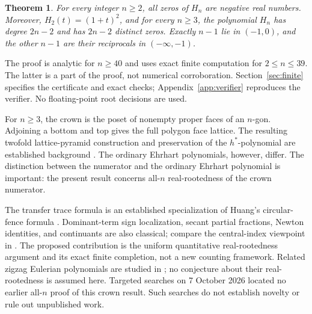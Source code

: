 \documentclass[11pt,letterpaper]{article}
\numberwithin{equation}{section}
\newtheorem{theorem}{Theorem}[section]
\begin{document}
\begin{theorem}\label{thm:main}
For every integer $n\ge2$, all zeros of $H_n$ are negative real numbers. Moreover, $H_2(t)=(1+t)^2$, and for every $n\ge3$, the polynomial $H_n$ has degree $2n-2$ and has $2n-2$ distinct zeros. Exactly $n-1$ lie in $(-1,0)$, and the other $n-1$ are their reciprocals in $(-\infty,-1)$.
\end{theorem}
The proof is analytic for $n\ge40$ and uses exact finite computation for $2\le n\le39$. The latter is a part of the proof, not numerical corroboration. Section~\ref{sec:finite} specifies the certificate and exact checks; Appendix~\ref{app:verifier} reproduces the verifier. No floating-point root decisions are used.

For $n\ge3$, the crown is the poset of nonempty proper faces of an $n$-gon. Adjoining a bottom and top gives the full polygon face lattice. The resulting twofold lattice-pyramid construction and preservation of the $h^*$-polynomial are established background \cite[Proposition~6.1 and Theorem~6.6]{LSML}. The ordinary Ehrhart polynomials, however, differ. The distinction between the numerator and the ordinary Ehrhart polynomial is important: the present result concerns all-$n$ real-rootedness of the crown numerator.

The transfer trace formula is an established specialization of Huang's circular-fence formula \cite[Proposition~4.1]{Huang}. Dominant-term sign localization, secant partial fractions, Newton identities, and continuants are also classical; compare the central-index viewpoint in \cite{FNS}. The proposed contribution is the uniform quantitative real-rootedness argument and its exact finite completion, not a new counting framework. Related zigzag Eulerian polynomials are studied in \cite{PZ}; no conjecture about their real-rootedness is assumed here. Targeted searches on 7 October 2026 located no earlier all-$n$ proof of this crown result. Such searches do not establish novelty or rule out unpublished work.
\end{document}
